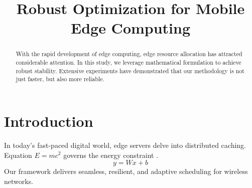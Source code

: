 \documentclass{article}
\begin{document}
\title{Robust Optimization for Mobile Edge Computing}
\maketitle

\begin{abstract}
With the rapid development of edge computing, edge resource allocation has attracted considerable attention.
In this study, we leverage mathematical formulation to achieve robust stability.
Extensive experiments have demonstrated that our methodology is not just faster, but also more reliable.
\end{abstract}

\section{Introduction}
In today's fast-paced digital world, edge servers delve into distributed caching.
Equation $E = mc^2$ governs the energy constraint \cite{author2025}.
\begin{equation}
y = W x + b
\end{equation}
Our framework delivers seamless, resilient, and adaptive scheduling for wireless networks.
\end{document}
